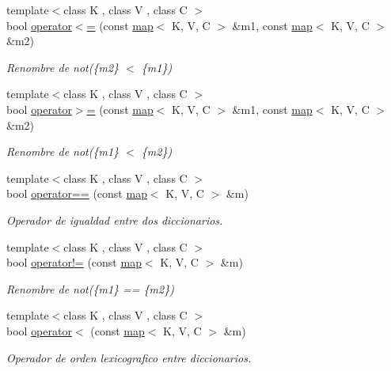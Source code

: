 \begin{Indent}
\begin{DoxyCompactItemize}
{\footnotesize template$<$class K , class V , class C $>$ }\\bool \hyperlink{classaed2_1_1map_afe374b37f17263d0cad3ee19a590d208}{operator$<$=} (const \hyperlink{classaed2_1_1map}{map}$<$ K, V, C $>$ \&m1, const \hyperlink{classaed2_1_1map}{map}$<$ K, V, C $>$ \&m2)
\begin{DoxyCompactList}\small\item\em Renombre de not(\{m2\} $<$ \{m1\}) \end{DoxyCompactList}\item 
{\footnotesize template$<$class K , class V , class C $>$ }\\bool \hyperlink{classaed2_1_1map_a093a6d1a055339c5fc6297a1d47a9159}{operator$>$=} (const \hyperlink{classaed2_1_1map}{map}$<$ K, V, C $>$ \&m1, const \hyperlink{classaed2_1_1map}{map}$<$ K, V, C $>$ \&m2)
\begin{DoxyCompactList}\small\item\em Renombre de not(\{m1\} $<$ \{m2\}) \end{DoxyCompactList}\item 
{\footnotesize template$<$class K , class V , class C $>$ }\\bool \hyperlink{classaed2_1_1map_ab32f94f4767358534ab704c98d23ad89}{operator==} (const \hyperlink{classaed2_1_1map}{map}$<$ K, V, C $>$ \&m)
\begin{DoxyCompactList}\small\item\em Operador de igualdad entre dos diccionarios. \end{DoxyCompactList}\item 
{\footnotesize template$<$class K , class V , class C $>$ }\\bool \hyperlink{classaed2_1_1map_a11627296a0eb71c87e69caa89fbd94eb}{operator!=} (const \hyperlink{classaed2_1_1map}{map}$<$ K, V, C $>$ \&m)
\begin{DoxyCompactList}\small\item\em Renombre de not(\{m1\} == \{m2\}) \end{DoxyCompactList}\item 
{\footnotesize template$<$class K , class V , class C $>$ }\\bool \hyperlink{classaed2_1_1map_a4d766795e9a996ed79f8c08fbd1676cd}{operator$<$} (const \hyperlink{classaed2_1_1map}{map}$<$ K, V, C $>$ \&m)
\begin{DoxyCompactList}\small\item\em Operador de orden lexicografico entre diccionarios. \end{DoxyCompactList}\item 

\end{DoxyCompactItemize}
\end{Indent}
